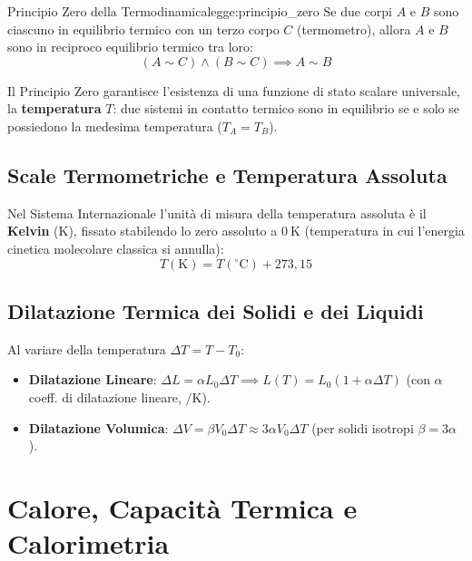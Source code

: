 \begin{legge}{Principio Zero della Termodinamica}{legge:principio_zero}
Se due corpi $A$ e $B$ sono ciascuno in equilibrio termico con un terzo corpo $C$ (termometro), allora $A$ e $B$ sono in reciproco equilibrio termico tra loro:
\begin{equation}
    (A \sim C) \land (B \sim C) \implies A \sim B
\end{equation}
\end{legge}

Il Principio Zero garantisce l'esistenza di una funzione di stato scalare universale, la \textbf{temperatura} $T$: due sistemi in contatto termico sono in equilibrio se e solo se possiedono la medesima temperatura ($T_A = T_B$).

\subsection{Scale Termometriche e Temperatura Assoluta}
Nel Sistema Internazionale l'unità di misura della temperatura assoluta è il \textbf{Kelvin} ($\si{\kelvin}$), fissato stabilendo lo zero assoluto a $\SI{0}{\kelvin}$ (temperatura in cui l'energia cinetica molecolare classica si annulla):
\begin{equation}
    T(\si{\kelvin}) = T(^\circ\text{C}) + 273{,}15
\end{equation}

\subsection{Dilatazione Termica dei Solidi e dei Liquidi}
Al variare della temperatura $\Delta T = T - T_0$:
\begin{itemize}
    \item \textbf{Dilatazione Lineare}: $\Delta L = \alpha L_0 \Delta T \implies L(T) = L_0(1 + \alpha\Delta T)$ (con $\alpha$ coeff. di dilatazione lineare, $\si{\per\kelvin}$).
    \item \textbf{Dilatazione Volumica}: $\Delta V = \beta V_0 \Delta T \approx 3\alpha V_0 \Delta T$ (per solidi isotropi $\beta = 3\alpha$).
\end{itemize}

\section{Calore, Capacità Termica e Calorimetria}
\label{sec:calore_calorimetria}

